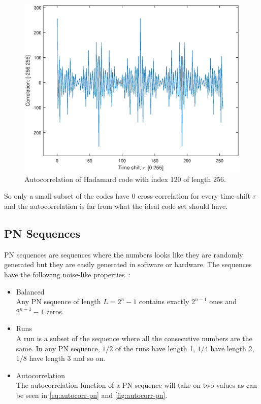 		\begin{figure}
			\centering
			\includegraphics[width=\textwidth]{chapters/CDMA/autocorr-hadamard.eps}
			\caption{Autocorrelation of Hadamard code with index 120 of length 256.}
			\label{fig:autocorr-hadamard}
		\end{figure}

		So only a small subset of the codes have $0$ cross-correlation for every time-shift $\tau$ and the autocorrelation is far from what the ideal code set should have.


	\subsection{PN Sequences}

		PN sequences are sequences where the numbers looks like they are randomly generated but they are easily generated in software or hardware.
		The sequences have the following noise-like properties~\cite{mitra2008pseudo}:

		\begin{itemize}
			\item Balanced \\
					Any PN sequence of length $L = 2^n - 1$ contains exactly $2^{n-1}$ ones and $2^{n-1} - 1$ zeros.

			\item Runs \\
					A run is a subset of the sequence where all the consecutive numbers are the same.
					In any PN sequence, $1/2$ of the runs have length 1, $1/4$ have length 2, $1/8$ have length 3 and so on.

			\item Autocorrelation \\
					The autocorrelation function of a PN sequence will take on two values as can be seen in \autoref{eq:autocorr-pn} and \autoref{fig:autocorr-pn}.


		\end{itemize}

